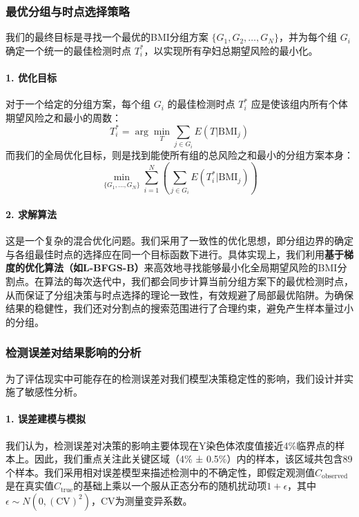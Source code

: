 \subsubsection{最优分组与时点选择策略}

我们的最终目标是寻找一个最优的BMI分组方案 $\{G_1, G_2, \dots, G_N\}$，并为每个组 $G_i$ 确定一个统一的最佳检测时点 $T_i^*$，以实现所有孕妇总期望风险的最小化。

\paragraph{1. 优化目标}
对于一个给定的分组方案，每个组 $G_i$ 的最佳检测时点 $T_i^*$ 应是使该组内所有个体期望风险之和最小的周数：
\begin{equation}
    T_i^* = \arg\min_{T} \sum_{j \in G_i} E(T | \text{BMI}_j)
\end{equation}
而我们的全局优化目标，则是找到能使所有组的总风险之和最小的分组方案本身：
\begin{equation}
    \min_{\{G_1, \dots, G_N\}} \sum_{i=1}^{N} \left( \sum_{j \in G_i} E(T_i^* | \text{BMI}_j) \right)
\end{equation}

\paragraph{2. 求解算法}
这是一个复杂的混合优化问题。我们采用了一致性的优化思想，即分组边界的确定与各组最佳时点的选择应在同一个目标函数下进行。具体实现上，我们利用\textbf{基于梯度的优化算法（如L-BFGS-B）}来高效地寻找能够最小化全局期望风险的BMI分割点。在算法的每次迭代中，我们都会同步计算当前分组方案下的最优检测时点，从而保证了分组决策与时点选择的理论一致性，有效规避了局部最优陷阱。为确保结果的稳健性，我们还对分割点的搜索范围进行了合理约束，避免产生样本量过小的分组。

\subsubsection{检测误差对结果影响的分析}

为了评估现实中可能存在的检测误差对我们模型决策稳定性的影响，我们设计并实施了敏感性分析。

\paragraph{1. 误差建模与模拟}
我们认为，检测误差对决策的影响主要体现在Y染色体浓度值接近4\%临界点的样本上。因此，我们重点关注此关键区域（4\% ± 0.5\%）内的样本，该区域共包含89个样本。我们采用相对误差模型来描述检测中的不确定性，即假定观测值$C_{\text{observed}}$是在真实值$C_{\text{true}}$的基础上乘以一个服从正态分布的随机扰动项$1 + \epsilon$，其中$\epsilon \sim N(0, (\text{CV})^2)$，CV为测量变异系数。

